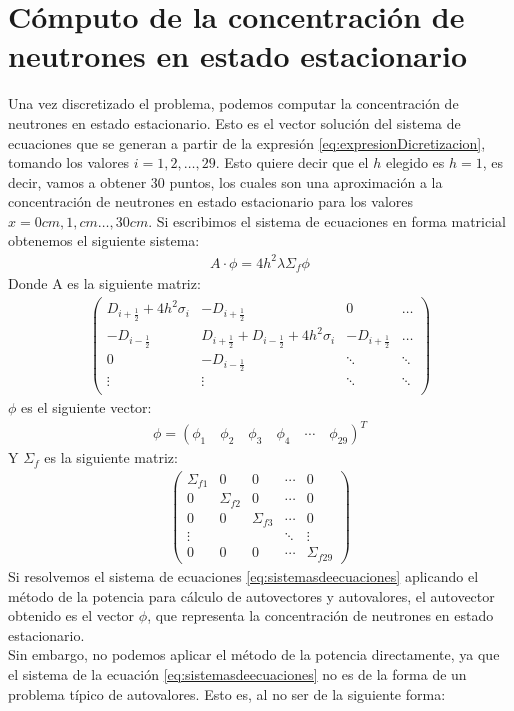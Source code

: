 \documentclass[11pt,a4paper]{emulateapj}
\begin{document}
\section{Cómputo de la concentración de neutrones en estado estacionario}
\label{sec:computo}
Una vez discretizado el problema, podemos computar la concentración de neutrones en estado estacionario. Esto es el vector solución del sistema de ecuaciones que se generan a partir de la expresión \ref{eq:expresionDicretizacion}, tomando los valores $i = 1,2,\ldots,29$. Esto quiere decir que el $h$ elegido es $h=1$, es decir, vamos a obtener 30 puntos, los cuales son una aproximación a la concentración de neutrones en estado estacionario para los valores $x=0cm,1,cm\ldots,30cm$. Si escribimos el sistema de ecuaciones en forma matricial obtenemos el siguiente sistema:
\begin{eqnarray}
\label{eq:sistemasdeecuaciones}
A \cdot \phi = 4h^2 \lambda \Sigma_f \phi
\end{eqnarray}
Donde A es la siguiente matriz:
\begin{eqnarray}
\label{eqn:matrizA}
	 \left( \begin{array}{cccc}
		D_{i+\frac{1}{2}} + 4h^2\sigma_i & -D_{i+\frac{1}{2}}  					& 0 		&  \dots \\
		-D_{i-\frac{1}{2}} 		& D_{i+\frac{1}{2}} + D_{i-\frac{1}{2}} + 4h^2\sigma_i 	& -D_{i+\frac{1}{2}} &  \dots \\
		0 & -D_{i-\frac{1}{2}}& \ddots & \ddots \\
		\vdots &\vdots&\ddots&\ddots\\
		\end{array} 
	\right)
\end{eqnarray}
$\phi$ es el siguiente vector:
\begin{eqnarray}
\phi = (\phi_1 \quad \phi_2 \quad \phi_3 \quad \phi_4 \quad \cdots\quad \phi_{29} )^T
\end{eqnarray}
Y $\Sigma_f$ es la siguiente matriz:
\begin{eqnarray}
\label{eqn:matrizA}
	 \left( \begin{array}{ccccc}
		\Sigma_{f1} & 0 & 0 & \cdots & 0\\
		0 & \Sigma_{f2} & 0 &\cdots & 0\\
		0 & 0 & \Sigma_{f3} &\cdots & 0\\
		\vdots & & & \ddots & \vdots \\
		0 & 0 & 0 & \cdots & \Sigma_{f29}
		\end{array} 
	\right)
\end{eqnarray}
Si resolvemos el sistema de ecuaciones \ref{eq:sistemasdeecuaciones} aplicando el método de la potencia para cálculo de autovectores y autovalores, el autovector obtenido es el vector $\phi$, que representa la concentración de neutrones en estado estacionario. \\
Sin embargo, no podemos aplicar el método de la potencia directamente, ya que el sistema de la ecuación \ref{eq:sistemasdeecuaciones} no es de la forma de un problema típico de autovalores. Esto es, al no ser de la siguiente forma:
\end{document}

